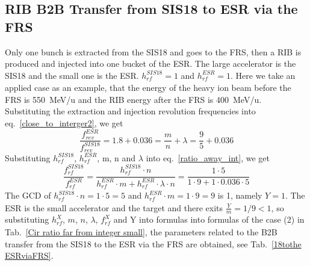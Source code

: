 \subsection{RIB B2B Transfer from SIS18 to ESR via the FRS} 
Only one bunch is extracted from the SIS18 and goes to the FRS, then a RIB is produced and injected into one bucket of the ESR. The large accelerator is the SIS18 and the small one is the ESR. $h^{\mathit{SIS18}}_\mathit{rf}=1$ and $h^{\mathit{ESR}}_\mathit{rf}=1$. Here we take an applied case as an example, that the energy of the heavy ion beam before the FRS is \SI{550}{MeV/\atomicmassunit} and the RIB energy after the FRS is \SI{400}{MeV/\atomicmassunit}. Substituting the extraction and injection revolution frequencies into eq.~\ref{close_to_interger2}, we get
\begin{equation} 
\frac{f_{\mathit{rev}}^{\mathit{ESR}}}{f_{\mathit{rev}}^{\mathit{SIS18}}}=1.8+0.036=\frac{m}{n}+ \lambda=\frac{9}{5}+0.036
\end{equation}
Substituting $h^{\mathit{SIS18}}_\mathit{rf}$, $h^{\mathit{ESR}}_\mathit{rf}$, m, n and $\lambda$ into eq.~\ref{ratio_away_int}, we get
\begin{equation}
\frac{f_{\mathit{rf}}^{\mathit{SIS18}}}{f_{\mathit{rf}}^{\mathit{ESR}}}=\frac{h^{\mathit{SIS18}}_\mathit{rf}\cdot n}{h^{\mathit{ESR}}_\mathit{rf} \cdot m+ h^{\mathit{ESR}}_\mathit{rf} \cdot\lambda\cdot n}=\frac{1\cdot 5}{1 \cdot 9+1 \cdot0.036\cdot 5}
\end{equation}
The GCD of $h^{\mathit{SIS18}}_\mathit{rf}\cdot n=1\cdot5=5$ and $h^{\mathit{ESR}}_\mathit{rf} \cdot m=1\cdot 9=9$ is 1, namely $Y=1$. The ESR is the small accelerator and the target and there exits $\frac{Y}{m}=1/9<1$, so substituting $h^X_\mathit{rf}$, $m$, $n$, $\lambda$, $f_{\mathit{rf}}^{X}$ and Y into formulas into formulas of the case (2) in Tab.~\ref{Cir ratio far from integer small}, the parameters related to the B2B transfer from the SIS18 to the ESR via the FRS are obtained, see Tab.~\ref{18tothe ESRviaFRS}.
